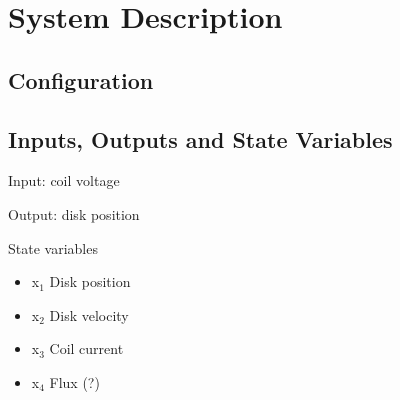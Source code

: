 \chapter{System Description} 


\section{Configuration}
%	




\section{Inputs, Outputs and State Variables}

Input: coil voltage

Output: disk position

State variables
\begin{itemize}
\item x$_1$  Disk position
\item x$_2$  Disk velocity
\item x$_3$  Coil current
\item x$_4$  Flux (?)
\end{itemize}